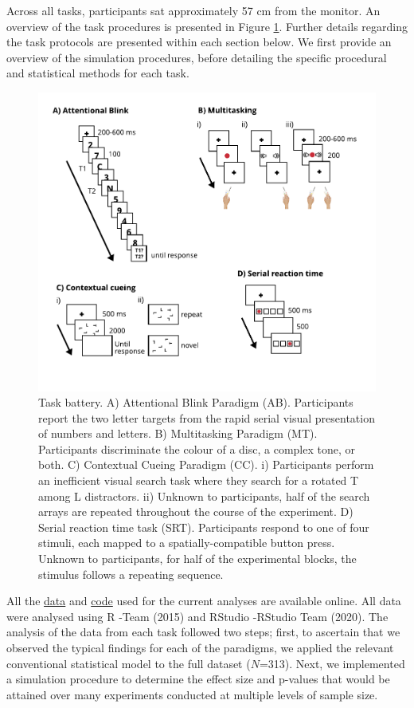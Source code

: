 \documentclass{article}
\begin{document}
\label{sec:Procedures}

Across all tasks, participants sat approximately 57 cm from the monitor. An overview of the task procedures is presented in Figure \ref{fig:FigureParadigm}. Further details regarding the task protocols are presented within each section below. We first provide an overview of the simulation procedures, before detailing the specific procedural and statistical methods for each task.

\begin{figure}

{\centering \includegraphics[width=0.7\linewidth]{../images/FigXXXX_alltasks} 

}

\caption{Task battery. A) Attentional Blink Paradigm (AB). Participants report the two letter targets from the rapid serial visual presentation of numbers and letters. B) Multitasking Paradigm (MT). Participants discriminate the colour of a disc, a complex tone, or both. C) Contextual Cueing Paradigm (CC). i) Participants perform an inefficient visual search task where they search for a rotated T among L distractors. ii) Unknown to participants, half of the search arrays are repeated throughout the course of the experiment. D) Serial reaction time task (SRT). Participants respond to one of four stimuli, each mapped to a spatially-compatible button press. Unknown to participants, for half of the experimental blocks, the stimulus follows a repeating sequence.}\label{fig:FigureParadigm}
\end{figure}

All the \href{https://doi.org/10.48610/1e6bf9a}{data} and \href{https://github.com/kel-github/Super-Effects}{code} used for the current analyses are available online. All data were analysed using R -Team (2015) and RStudio -RStudio Team (2020). The analysis of the data from each task followed two steps; first, to ascertain that we observed the typical findings for each of the paradigms, we applied the relevant conventional statistical model to the full dataset (\(N\)=313). Next, we implemented a simulation procedure to determine the effect size and p-values that would be attained over many experiments conducted at multiple levels of sample size.
\end{document}
